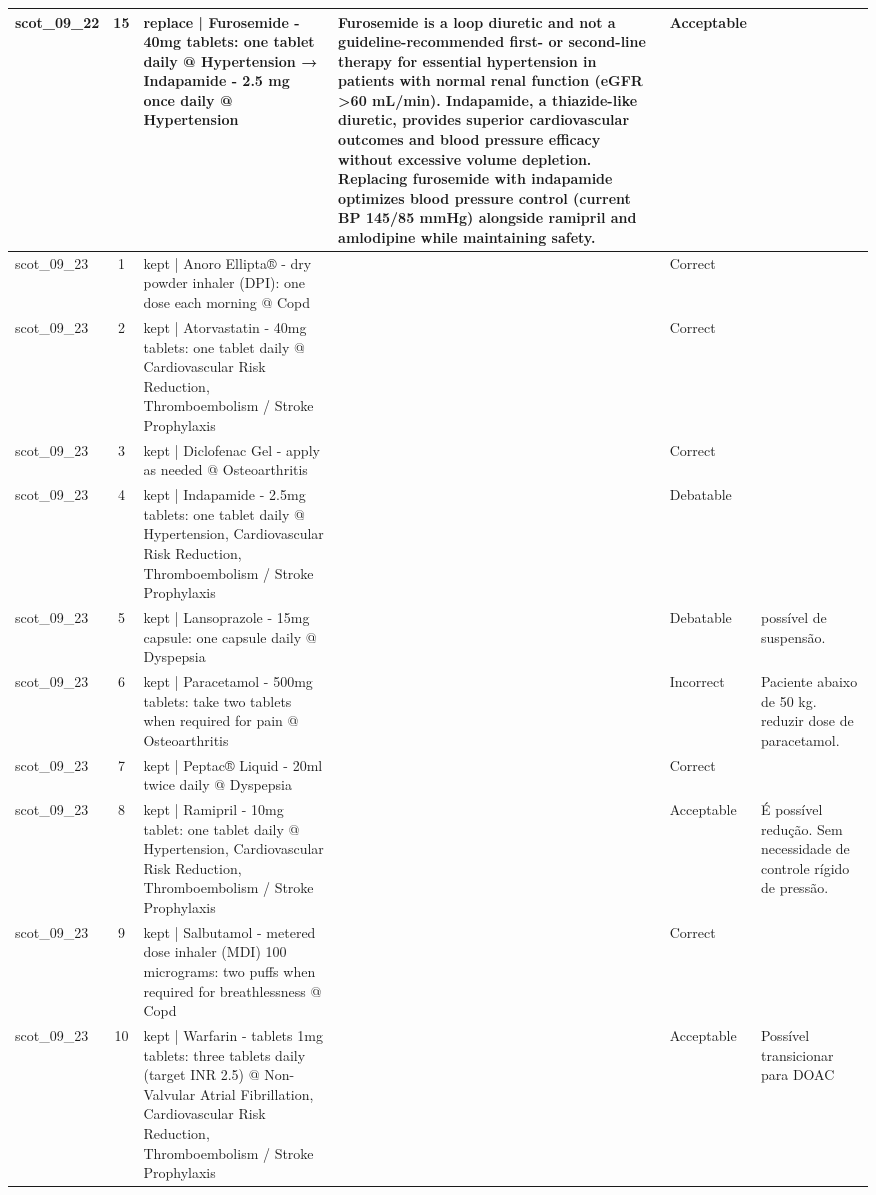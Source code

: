 \begin{longtable}{|p{1.45cm}|c|p{3.3cm}|p{6.5cm}|p{1.55cm}|p{2.3cm}|}
\hline
scot\_09\_22 & 15 & replace | Furosemide - 40mg tablets: one tablet daily @ Hypertension → Indapamide - 2.5 mg once daily @ Hypertension & Furosemide is a loop diuretic and not a guideline-recommended first- or second-line therapy for essential hypertension in patients with normal renal function (eGFR >60 mL/min). Indapamide, a thiazide-like diuretic, provides superior cardiovascular outcomes and blood pressure efficacy without excessive volume depletion. Replacing furosemide with indapamide optimizes blood pressure control (current BP 145/85 mmHg) alongside ramipril and amlodipine while maintaining safety. & Acceptable &  \\
\hline
scot\_09\_23 & 1 & kept | Anoro Ellipta® - dry powder inhaler (DPI): one dose each morning @ Copd &  & Correct &  \\
\hline
scot\_09\_23 & 2 & kept | Atorvastatin - 40mg tablets: one tablet daily @ Cardiovascular Risk Reduction, Thromboembolism / Stroke Prophylaxis &  & Correct &  \\
\hline
scot\_09\_23 & 3 & kept | Diclofenac Gel - apply as needed @ Osteoarthritis &  & Correct &  \\
\hline
scot\_09\_23 & 4 & kept | Indapamide - 2.5mg tablets: one tablet daily @ Hypertension, Cardiovascular Risk Reduction, Thromboembolism / Stroke Prophylaxis &  & Debatable &  \\
\hline
scot\_09\_23 & 5 & kept | Lansoprazole - 15mg capsule: one capsule daily @ Dyspepsia &  & Debatable & possível de suspensão. \\
\hline
scot\_09\_23 & 6 & kept | Paracetamol - 500mg tablets: take two tablets when required for pain @ Osteoarthritis &  & Incorrect & Paciente abaixo de 50 kg. reduzir dose de paracetamol. \\
\hline
scot\_09\_23 & 7 & kept | Peptac® Liquid - 20ml twice daily @ Dyspepsia &  & Correct &  \\
\hline
scot\_09\_23 & 8 & kept | Ramipril - 10mg tablet: one tablet daily @ Hypertension, Cardiovascular Risk Reduction, Thromboembolism / Stroke Prophylaxis &  & Acceptable & É possível redução. Sem necessidade de controle rígido de pressão. \\
\hline
scot\_09\_23 & 9 & kept | Salbutamol - metered dose inhaler (MDI) 100 micrograms: two puffs when required for breathlessness @ Copd &  & Correct &  \\
\hline
scot\_09\_23 & 10 & kept | Warfarin - tablets 1mg tablets: three tablets daily (target INR 2.5) @ Non-Valvular Atrial Fibrillation, Cardiovascular Risk Reduction, Thromboembolism / Stroke Prophylaxis &  & Acceptable & Possível transicionar para DOAC \\

\end{longtable}
